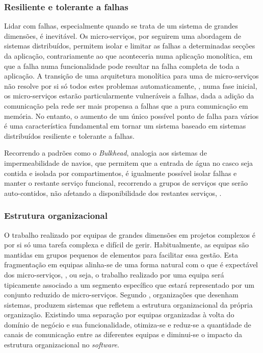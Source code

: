     
    \subsubsection*{Resiliente e tolerante a falhas}
        
       Lidar com falhas, especialmente quando se trata de um sistema de grandes dimensões, é inevitável. Os micro-serviços, por seguirem uma abordagem de sistemas distribuídos, permitem isolar e limitar as falhas a determinadas secções da aplicação, contrariamente ao que aconteceria numa aplicação monolítica, em que a falha numa funcionalidade pode resultar na falha completa de toda a aplicação.
       A transição de uma arquitetura monolítica para uma de micro-serviços não resolve por si só todos estes problemas automaticamente, \cite{behara_2018_resilient_ms}, numa fase inicial, os micro-serviços estarão particularmente vulneráveis a falhas, dada a adição da comunicação pela rede ser mais propensa a falhas que a pura comunicação em memória. No entanto, o aumento de um único possível ponto de falha para vários é uma característica fundamental em tornar um sistema baseado em sistemas distribuídos resiliente e tolerante a falhas.
       
       Recorrendo a padrões como o \textit{Bulkhead}, analogia aos sistemas de impermeabilidade de navios, que permitem que a entrada de água no casco seja contida e isolada por compartimentos, é igualmente possível isolar falhas e manter o restante serviço funcional, recorrendo a grupos de serviços que serão auto-contidos, não afetando a disponibilidade dos restantes serviços, \cite{bulkhead_pattern}.
       
       
        
    
    \subsubsection*{Estrutura organizacional}
       
       O trabalho realizado por equipas de grandes dimensões em projetos complexos é por si só uma tarefa complexa e difícil de gerir. Habitualmente, as equipas são mantidas em grupos pequenos de elementos para facilitar essa gestão. Esta fragmentação em equipas alinha-se de uma forma natural com o que é expectável dos micro-serviços, \cite{newman2015microservices}, ou seja, o trabalho realizado por uma equipa será tipicamente associado a um segmento específico que estará representado por um conjunto reduzido de micro-serviços.  Segundo \cite{conwayslaw}, organizações que desenham sistemas, produzem sistemas que refletem a estrutura organizacional da própria organização. Existindo uma separação por equipas organizadas à volta do domínio de negócio e sua funcionalidade, otimiza-se e reduz-se a quantidade de canais de comunicação entre as diferentes equipas e diminui-se o impacto da estrutura organizacional no \textit{software}. 
       
